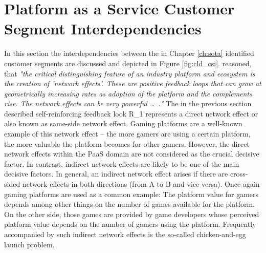 \section{Platform as a Service Customer Segment Interdependencies}\label{ch:cld:csi}

In this section the interdependencies between the in Chapter \ref{ch:sota} identified customer segments are discussed and depicted in Figure \ref{fig:cld_csi}. \citet[p. 33]{Cusumano2010} reasoned, that \textit{"the critical distinguishing feature of an industry platform and ecosystem is the creation of 'network effects'. These are positive feedback loops that can grow at geometrically increasing rates as adoption of the platform and the complements rise. The network effects can be very powerful \ldots~."} The in the previous section described self-reinforcing feedback look R\_1 represents a direct network effect or also known as same-side network effect. Gaming platforms are a well-known example of this network effect -- the more gamers are using a certain platform, the more valuable the platform becomes for other gamers. However, the direct network effects within the \ac{PaaS} domain are not considered as the crucial decisive factor. In contrast, indirect network effects are likely to be one of the main decisive factors. In general, an indirect network effect arises if there are cross-sided network effects in both directions (from A to B and vice versa). Once again gaming platforms are used as a common example: The platform value for gamers depends among other things on the number of games available for the platform. On the other side, those games are provided by game developers whose perceived platform value depends on the number of gamers using the platform. Frequently accompanied by such indirect network effects is the so-called chicken-and-egg launch problem. 

